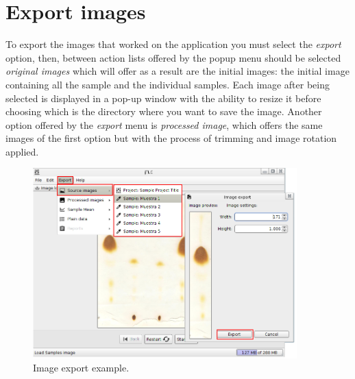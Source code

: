 \section{Export images}
To export the images that worked on the application you must select the \emph{export} option, then, between action lists offered by the popup menu should be selected \emph{original images} which will offer as a result are the initial images: the initial image containing all the sample and the individual samples. Each image after being selected is displayed in a pop-up window with the ability to resize it before choosing which is the directory where you want to save the image.
Another option offered by the \emph{export} menu is \emph{processed image}, which offers the same images of the first option but with the process of trimming and image rotation applied.
\begin{figure}[H]
	\vspace{0cm}
	\centering
	\includegraphics[width=385px]{imagenes/export_image}
	\centering
	\vspace{-0.4cm}
	\caption{Image export example.}
	\label{fig:export_images}
	\vspace{-0.25cm}
\end{figure}
\newpage

